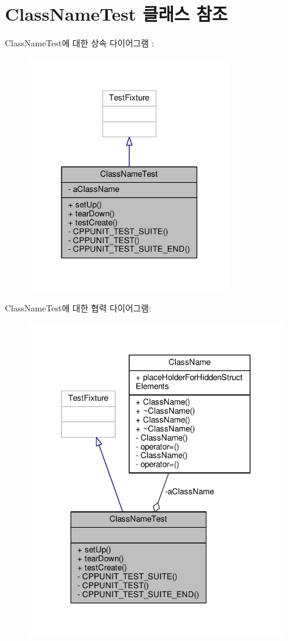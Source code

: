 \hypertarget{class_class_name_test}{}\section{Class\+Name\+Test 클래스 참조}
\label{class_class_name_test}


Class\+Name\+Test에 대한 상속 다이어그램 \+: 
\nopagebreak
\begin{figure}[H]
\begin{center}
\leavevmode
\includegraphics[width=247pt]{class_class_name_test__inherit__graph}
\end{center}
\end{figure}


Class\+Name\+Test에 대한 협력 다이어그램\+:
\nopagebreak
\begin{figure}[H]
\begin{center}
\leavevmode
\includegraphics[width=313pt]{class_class_name_test__coll__graph}
\end{center}
\end{figure}

